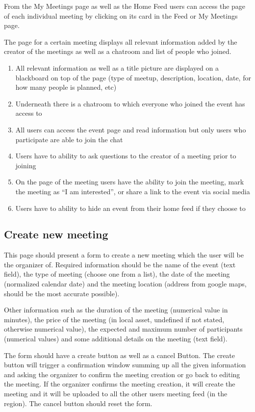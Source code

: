 \documentclass[conference]{IEEEtran}
\begin{document}
From the My Meetings page as well as the Home Feed users can access the page of each individual meeting by clicking on its card in the Feed or My Meetings page.

The page for a certain meeting displays all relevant information added by the creator of the meetings as well as a chatroom and list of people who joined.

\begin{enumerate}
\item All relevant information as well as a title picture are displayed on a blackboard on top of the page (type of meetup, description, location, date, for how many people is planned, etc)
\item Underneath there is a chatroom to which everyone who joined the event has access to
\item All users can access the event page and read information but only users who participate are able to join the chat
\item Users have to ability to ask questions to the creator of a meeting prior to joining
\item On the page of the meeting users have the ability to join the meeting, mark the meeting as “I am interested”, or share a link to the event via social media
\item Users have to ability to hide an event from their home feed if they choose to
\end{enumerate}

\subsection{Create new meeting}

This page should present a form to create a new meeting
which the user will be the organizer of. Required information should be the name of the event (text field), the type of meeting (choose one from a list), the date of the meeting (normalized calendar date) and the meeting location (address from google maps, should be the most accurate possible).

Other information such as the duration of the meeting (numerical value in minutes), the price of the meeting (in local asset, undefined if not stated, otherwise numerical value), the expected and maximum number of participants (numerical values) and some additional details on the meeting (text field).

The form should have a create button as well as a cancel Button. The create button will trigger a confirmation window summing up all the given information and asking the organizer to confirm the meeting creation or go back to editing the meeting. If the organizer confirms the meeting creation, it will create the meeting and it will be uploaded to all the other users meeting feed (in the region). The cancel button should reset the form.
\end{document}
